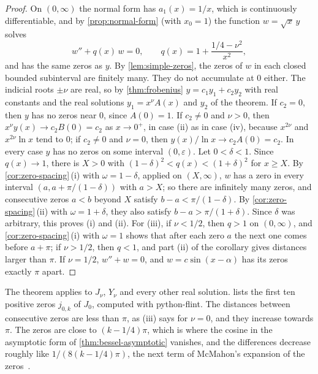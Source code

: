 \begin{proof}
On $(0,\infty)$ the normal form has $a_1(x)=1/x$, which is continuously differentiable, and by \cref{prop:normal-form} (with $x_0=1$) the function $w=\sqrt x\,y$ solves
\[
w''+q(x)\,w=0,\qquad q(x)=1+\frac{1/4-\nu^2}{x^2},
\]
and has the same zeros as $y$. By \cref{lem:simple-zeros}, the zeros of $w$ in each closed bounded subinterval are finitely many. They do not accumulate at $0$ either. The indicial roots $\pm\nu$ are real, so by \cref{thm:frobenius} $y=c_1y_1+c_2y_2$ with real constants and the real solutions $y_1=x^\nu A(x)$ and $y_2$ of the theorem. If $c_2=0$, then $y$ has no zeros near $0$, since $A(0)=1$. If $c_2\ne0$ and $\nu>0$, then $x^\nu y(x)\to c_2B(0)=c_2$ as $x\to0^+$, in case (ii) as in case (iv), because $x^{2\nu}$ and $x^{2\nu}\ln x$ tend to $0$; if $c_2\ne0$ and $\nu=0$, then $y(x)/\ln x\to c_2A(0)=c_2$. In every case $y$ has no zeros on some interval $(0,\varepsilon)$. Let $0<\delta<1$. Since $q(x)\to1$, there is $X>0$ with $(1-\delta)^2<q(x)<(1+\delta)^2$ for $x\ge X$. By \cref{cor:zero-spacing}\,(i) with $\omega=1-\delta$, applied on $(X,\infty)$, $w$ has a zero in every interval $(a,a+\pi/(1-\delta))$ with $a>X$; so there are infinitely many zeros, and consecutive zeros $a<b$ beyond $X$ satisfy $b-a<\pi/(1-\delta)$. By \cref{cor:zero-spacing}\,(ii) with $\omega=1+\delta$, they also satisfy $b-a>\pi/(1+\delta)$. Since $\delta$ was arbitrary, this proves (i) and (ii). For (iii), if $\nu<1/2$, then $q>1$ on $(0,\infty)$, and \cref{cor:zero-spacing}\,(i) with $\omega=1$ shows that after each zero $a$ the next one comes before $a+\pi$; if $\nu>1/2$, then $q<1$, and part (ii) of the corollary gives distances larger than $\pi$. If $\nu=1/2$, $w''+w=0$, and $w=c\sin(x-\alpha)$ has its zeros exactly $\pi$ apart.
\end{proof}

The theorem applies to $J_\nu$, $Y_\nu$ and every other real solution.  lists the first ten positive zeros $j_{0,k}$ of $J_0$, computed with python-flint. The distances between consecutive zeros are less than $\pi$, as (iii) says for $\nu=0$, and they increase towards $\pi$. The zeros are close to $(k-1/4)\pi$, which is where the cosine in the asymptotic form of \cref{thm:bessel-asymptotic} vanishes, and the differences decrease roughly like $1/(8(k-1/4)\pi)$, the next term of McMahon's expansion of the zeros~\cite[Sect.~10.21(vi)]{olver2010nist}.


